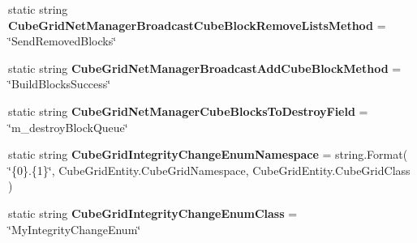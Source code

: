 \begin{DoxyCompactItemize}
\item 
\hypertarget{class_s_e_mod_a_p_i_internal_1_1_a_p_i_1_1_entity_1_1_sector_1_1_sector_object_1_1_cube_grid_network_manager_a2981e9316543e57aff2f3ffc4c52680e}{}static string {\bfseries Cube\+Grid\+Net\+Manager\+Broadcast\+Cube\+Block\+Remove\+Lists\+Method} = \char`\"{}Send\+Removed\+Blocks\char`\"{}\label{class_s_e_mod_a_p_i_internal_1_1_a_p_i_1_1_entity_1_1_sector_1_1_sector_object_1_1_cube_grid_network_manager_a2981e9316543e57aff2f3ffc4c52680e}

\item 
\hypertarget{class_s_e_mod_a_p_i_internal_1_1_a_p_i_1_1_entity_1_1_sector_1_1_sector_object_1_1_cube_grid_network_manager_ad3743dee05192f933791f5da1e15300e}{}static string {\bfseries Cube\+Grid\+Net\+Manager\+Broadcast\+Add\+Cube\+Block\+Method} = \char`\"{}Build\+Blocks\+Success\char`\"{}\label{class_s_e_mod_a_p_i_internal_1_1_a_p_i_1_1_entity_1_1_sector_1_1_sector_object_1_1_cube_grid_network_manager_ad3743dee05192f933791f5da1e15300e}

\item 
\hypertarget{class_s_e_mod_a_p_i_internal_1_1_a_p_i_1_1_entity_1_1_sector_1_1_sector_object_1_1_cube_grid_network_manager_ad5535480cdc8a6c2bc449ff331c95c52}{}static string {\bfseries Cube\+Grid\+Net\+Manager\+Cube\+Blocks\+To\+Destroy\+Field} = \char`\"{}m\+\_\+destroy\+Block\+Queue\char`\"{}\label{class_s_e_mod_a_p_i_internal_1_1_a_p_i_1_1_entity_1_1_sector_1_1_sector_object_1_1_cube_grid_network_manager_ad5535480cdc8a6c2bc449ff331c95c52}

\item 
\hypertarget{class_s_e_mod_a_p_i_internal_1_1_a_p_i_1_1_entity_1_1_sector_1_1_sector_object_1_1_cube_grid_network_manager_acd7c1490d277693dc76fb0404a1fdd15}{}static string {\bfseries Cube\+Grid\+Integrity\+Change\+Enum\+Namespace} = string.\+Format( \char`\"{}\{0\}.\{1\}\char`\"{}, Cube\+Grid\+Entity.\+Cube\+Grid\+Namespace, Cube\+Grid\+Entity.\+Cube\+Grid\+Class )\label{class_s_e_mod_a_p_i_internal_1_1_a_p_i_1_1_entity_1_1_sector_1_1_sector_object_1_1_cube_grid_network_manager_acd7c1490d277693dc76fb0404a1fdd15}

\item 
\hypertarget{class_s_e_mod_a_p_i_internal_1_1_a_p_i_1_1_entity_1_1_sector_1_1_sector_object_1_1_cube_grid_network_manager_af1bd9905b4b17ecffb35a8fe4fd17006}{}static string {\bfseries Cube\+Grid\+Integrity\+Change\+Enum\+Class} = \char`\"{}My\+Integrity\+Change\+Enum\char`\"{}\label{class_s_e_mod_a_p_i_internal_1_1_a_p_i_1_1_entity_1_1_sector_1_1_sector_object_1_1_cube_grid_network_manager_af1bd9905b4b17ecffb35a8fe4fd17006}

\end{DoxyCompactItemize}
